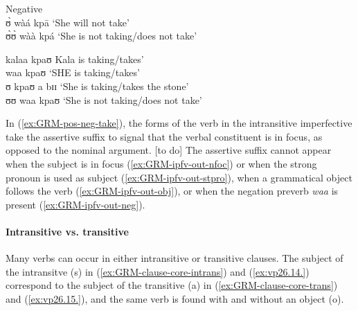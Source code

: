 \begin{exe}
\begin{exe}
\begin{exe}
{\begin{exe}
\begin{exe}
\begin{exe}
\begin{exe}
\begin{exe}
\begin{exe}
\begin{exe}
\begin{xlist}
\begin{exe}
\begin{exe}
\begin{exe}
\begin{exe}
\begin{exe}
\begin{exe}
\begin{exe}
\begin{exe}
\begin{exe}
\begin{exe}
\begin{exe}
\begin{exe}
\begin{exe}
\ex\label{ex:GRM-ipfv-out-neg}{\rm Negative}\\
 ʊ̀ wàá kpā  {\rm  `She will not take'} \\
   ʊ̀ʊ̀   wàà   kpá {\rm `She  is not taking/does not take'}

   
   \ex\label{ex:GRM-ipfv-out-nfoc}
    \textasteriskcentered kalaa kpaʊ {\rm Kala is taking/takes'}\\
      \ex\label{ex:GRM-ipfv-out-stpro}
 \textasteriskcentered waa kpaʊ {\rm `SHE is taking/takes'}\\
       \ex\label{ex:GRM-ipfv-out-obj}
  \textasteriskcentered ʊ kpaʊ a bɪɪ  {\rm `She  is taking/takes the 
stone'} \\
    \ex\label{ex:GRM-ipfv-out-neg}
      \textasteriskcentered   ʊʊ   waa   kpaʊ {\rm `She  is not taking/does 
not take'}

\z 
 \z

In (\ref{ex:GRM-pos-neg-take}), the forms of the verb in the
intransitive imperfective take the assertive suffix to signal that the verbal
constituent is in focus, as opposed to the nominal argument. [to do] The 
assertive suffix cannot appear
when the subject is in focus (\ref{ex:GRM-ipfv-out-nfoc}) or when the strong
pronoun is used as subject (\ref{ex:GRM-ipfv-out-stpro}), when a grammatical
object follows the verb  (\ref{ex:GRM-ipfv-out-obj}), or when the negation
preverb {\it waa} is present  (\ref{ex:GRM-ipfv-out-neg}).



\paragraph{Intransitive vs. transitive}
\label{sec:GRM-trans-intran}


Many verbs can occur in either  intransitive or transitive clauses. The subject 
of the intransitve ({\sc s}) in (\ref{ex:GRM-clause-core-intrans}) and 
(\ref{ex:vp26.14.}) correspond to the subject of the transitive ({\sc a}) in  
(\ref{ex:GRM-clause-core-trans}) and (\ref{ex:vp26.15.}), and the same verb is 
found with and without an object ({\sc o}).


\begin{multicols}{2}
\ea\label{ex:GRM-clause-core}



\end{multicols}
\end{exe}
\end{exe}
\end{exe}
\end{exe}
\end{exe}
\end{exe}
\end{exe}
\end{exe}
\end{exe}
\end{exe}
\end{exe}
\end{exe}
\end{exe}
\end{xlist}
\end{exe}
\end{exe}
\end{exe}
\end{exe}
\end{exe}
\end{exe}
\end{exe}}
\end{exe}
\end{exe}
\end{exe}

